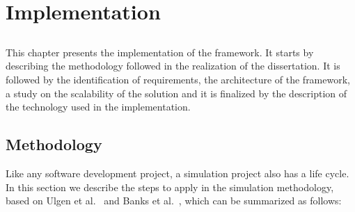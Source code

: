 \chapter{Implementation} \label{chap:implementation}

\section*{}

This chapter presents the implementation of the framework. It starts by 
describing the methodology followed in the realization of the dissertation. It 
is followed by the identification of requirements, the architecture of the 
framework, a study on the scalability of the solution and it is finalized by 
the description of the technology used in the implementation.

\section{Methodology} \label{sec:meth}

Like any software development project, a simulation project also has a life 
cycle. In this section we describe the steps to apply in the simulation 
methodology, based on Ulgen et al.~\cite{Ulgen1994} and Banks et 
al.~\cite[section 1.11]{Banks2004}, which can be summarized as follows:

